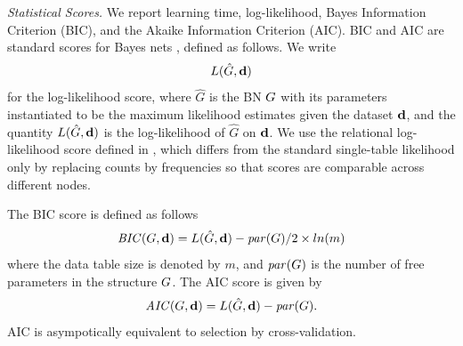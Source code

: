 \documentclass{vldb}
\begin{document}
\emph{Statistical Scores.}
We report learning time, log-likelihood, Bayes Information Criterion (BIC), and the Akaike Information Criterion (AIC). BIC and AIC are standard scores for Bayes nets \cite{Chickering2003}, defined as follows. We write 
$$L(\hat{G},\mathbf{d})$$ for the log-likelihood score,
where $\hat{G}$ is the BN $G$ with its parameters instantiated to be the maximum likelihood estimates given the dataset $\mathbf{d}$, and the quantity $L(\hat{G},\mathbf{d})$ is the log-likelihood of $\hat{G}$ on $\mathbf{d}$. We use the relational log-likelihood score defined in \cite{Schulte2011}, which differs from the standard single-table likelihood  only by replacing counts by frequencies so that scores are comparable across different nodes.

The BIC score is defined as follows \cite{Chickering2003,Schulte2011}
$$\mathit{BIC}(G,\mathbf{d}) = L(\hat{G},\mathbf{d}) - \mathit{par}(G)/2 \times ln(m)$$
where the data table size is denoted by $m$, and $\mathit{par}(G)$ is the number of free parameters in the structure $G$. The AIC score is given by 
$$\mathit{AIC}(G,\mathbf{d}) = L(\hat{G},\mathbf{d}) - \mathit{par}(G). $$
AIC is asympotically equivalent to selection by cross-validation.
\end{document}
